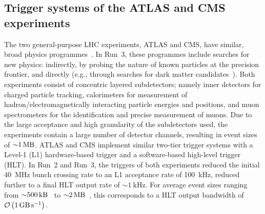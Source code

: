 \subsection{Trigger systems of the ATLAS and CMS experiments}

The two general-purpose LHC experiments, ATLAS and CMS, have similar, broad physics programmes~\cite{ATLASMachine,collaboration2008cms}. In Run~3, these programmes include searches for new physics: indirectly, by probing the nature of known particles at the precision frontier, and directly (e.g.,  through searches for dark matter candidates~\cite{snowmass-darkmatter}). Both experiments consist of concentric layered subdetectors; namely inner detectors for charged particle tracking, calorimeters for measurement of hadron/electromagnetically interacting particle energies and positions, and muon spectrometers for the identification and precise measurement of muons. Due to the large acceptance and high granularity of the subdetectors used, the experiments contain a large number of detector channels, resulting in event sizes of ${\sim}\SI{1}{\mega\byte}$. ATLAS and CMS implement similar two-tier trigger systems with a Level-1 (L1) hardware-based trigger and a software-based high-level trigger (HLT). In Run~2 and Run~3, the triggers of both experiments reduced the initial \SI{40}{\mega\hertz} bunch crossing rate to an L1 acceptance rate of \SI{100}{\kilo\hertz}, reduced further to a final HLT output rate of ${\sim}\SI{1}{\kilo\hertz}$. For average event sizes ranging from ${\sim}\SI{500}{\kilo\byte}$~\cite{ATLASRun3EventBuilder} to ${\sim}\SI{2}{\mega\byte}$~\cite{cmsRun3EventBuilder}, this corresponds to a HLT output bandwidth of $\mathcal{O}\left(\SI{1}{\giga\byte\per\second}\right)$.
